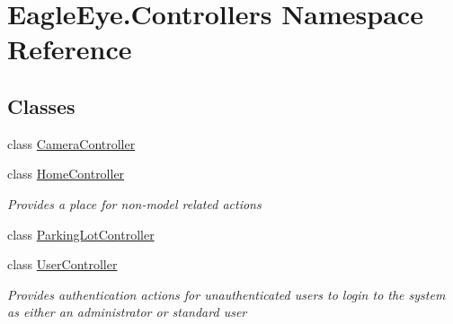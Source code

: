 \hypertarget{namespace_eagle_eye_1_1_controllers}{}\section{Eagle\+Eye.\+Controllers Namespace Reference}
\label{namespace_eagle_eye_1_1_controllers}
\subsection*{Classes}
\begin{DoxyCompactItemize}
\item 
class \mbox{\hyperlink{class_eagle_eye_1_1_controllers_1_1_camera_controller}{Camera\+Controller}}
\item 
class \mbox{\hyperlink{class_eagle_eye_1_1_controllers_1_1_home_controller}{Home\+Controller}}
\begin{DoxyCompactList}\small\item\em Provides a place for non-\/model related actions \end{DoxyCompactList}\item 
class \mbox{\hyperlink{class_eagle_eye_1_1_controllers_1_1_parking_lot_controller}{Parking\+Lot\+Controller}}
\item 
class \mbox{\hyperlink{class_eagle_eye_1_1_controllers_1_1_user_controller}{User\+Controller}}
\begin{DoxyCompactList}\small\item\em Provides authentication actions for unauthenticated users to login to the system as either an administrator or standard user \end{DoxyCompactList}\end{DoxyCompactItemize}
